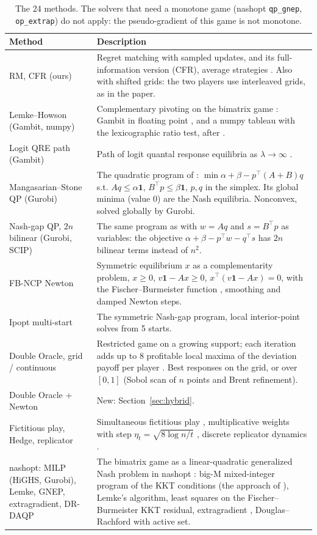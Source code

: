 \documentclass[10pt,a4paper]{article}
\begin{document}
\begin{table}[H]
\centering\small
\begin{tabular}{p{4.6cm}p{11.6cm}}
\toprule
Method & Description \\
\midrule
RM, CFR (ours) & Regret matching with sampled updates, and its full-information version
(CFR), average strategies \cite{hart2000,zinkevich2007,abraham2023}. Also with shifted grids: the
two players use interleaved grids, as in the paper. \\
Lemke--Howson (Gambit, numpy) & Complementary pivoting on the bimatrix game \cite{lemke1964}:
Gambit in floating point \cite{gambit}, and a numpy tableau with the lexicographic ratio test,
after \cite{mathecon}. \\
Logit QRE path (Gambit) & Path of logit quantal response equilibria as $\lambda\to\infty$
\cite{mckelvey1995,turocy2005}. \\
Mangasarian--Stone QP (Gurobi) & The quadratic program of \cite{mangasarian1964}:
$\min \alpha+\beta-p^\top(A+B)q$ s.t. $Aq\le\alpha\mathbf 1$, $B^\top p\le\beta\mathbf 1$, $p,q$
in the simplex. Its global minima (value 0) are the Nash equilibria. Nonconvex, solved globally
by Gurobi. \\
Nash-gap QP, $2n$ bilinear (Gurobi, SCIP) & The same program as \cite{mangasarian1964} with
$w=Aq$ and $s=B^\top p$ as variables: the objective $\alpha+\beta-p^\top w-q^\top s$ has $2n$
bilinear terms instead of $n^2$. \\
FB-NCP Newton & Symmetric equilibrium $x$ as a complementarity problem, $x\ge0$, $v\mathbf1-Ax\ge0$,
$x^\top(v\mathbf 1-Ax)=0$, with the Fischer--Burmeister function \cite{fischer1992}, smoothing and
damped Newton steps. \\
Ipopt multi-start & The symmetric Nash-gap program, local interior-point solves \cite{ipopt} from 5
starts. \\
Double Oracle, grid / continuous & Restricted game on a growing support; each iteration adds up to
8 profitable local maxima of the deviation payoff per player \cite{mcmahan2003}. Best responses on
the grid, or over $[0,1]$ (Sobol scan of $n$ points and Brent refinement). \\
Double Oracle + Newton & New: Section~\ref{sec:hybrid}. \\
Fictitious play, Hedge, replicator & Simultaneous fictitious play \cite{brown1951,robinson1951},
multiplicative weights with step $\eta_t=\sqrt{8\log n/t}$ \cite{freund1999}, discrete replicator
dynamics \cite{taylor1978}. \\
nashopt: MILP (HiGHS, Gurobi), Lemke, GNEP, extragradient, DR-DAQP & The bimatrix game as a
linear-quadratic generalized Nash problem in nashopt \cite{nashopt}: big-M mixed-integer program
of the KKT conditions (the approach of \cite{sandholm2005}), Lemke's algorithm, least squares on
the Fischer--Burmeister KKT residual, extragradient \cite{korpelevich1976}, Douglas--Rachford with
active set. \\
\bottomrule
\end{tabular}
\caption{The 24 methods. The solvers that need a monotone game (nashopt \texttt{qp\_gnep},
\texttt{op\_extrap}) do not apply: the pseudo-gradient of this game is not monotone.}
\end{table}
\end{document}
